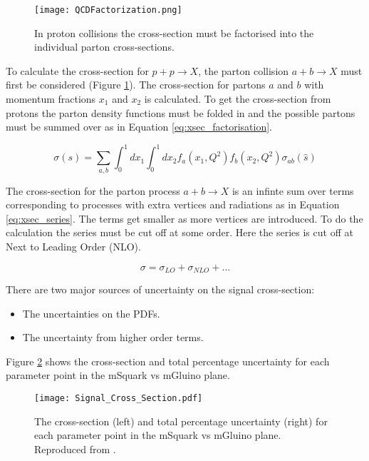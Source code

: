 \begin{figure}
\begin{center}
\texttt{[image: QCDFactorization.png]}
\end{center}
\caption{In proton collisions the cross-section must be factorised into the 
individual parton cross-sections.}
\label{fig:QCDFactorization}
\end{figure}

To calculate the cross-section for $p + p \rightarrow X$, the parton collision 
$a + b \rightarrow X$ must first be considered (Figure 
\ref{fig:QCDFactorization}). The cross-section for partons $a$ and $b$ with 
momentum fractions $x_{1}$ and $x_{2}$ is calculated. To get the cross-section 
from protons the parton density functions must be folded in and the possible 
partons must be summed over as in Equation \ref{eq:xsec_factorisation}.

\begin{equation}
\sigma(s) =
\displaystyle\sum\limits_{a,b}\int_{0}^{1}dx_{1}\int_{0}^{1}dx_{2}f_{a}(x_{1},Q^{2})f_{b}(x_{2},Q^{2})\sigma_{ab}(\hat{s})
\label{eq:xsec_factorisation}
\end{equation}

The cross-section for the parton process $a + b \rightarrow X$ is an infinte sum
over terms corresponding to processes with extra vertices and radiations as in
Equation \ref{eq:xsec_series}. The terms get smaller as more vertices are 
introduced. To do the calculation the series must be cut off at some order. Here
the series is cut off at Next to Leading Order (NLO).

\begin{equation}
\sigma = \sigma_{LO} + \sigma_{NLO} + ...
\label{eq:xsec_series}
\end{equation}

There are two major sources of uncertainty on the signal cross-section:

\begin{itemize} 
\item The uncertainties on the PDFs.
\item The uncertainty from higher order terms.
\end{itemize}

Figure \ref{fig:xsec_unc} shows the cross-section and total percentage 
uncertainty for each parameter point in the mSquark vs mGluino plane.

\begin{figure}
\begin{center}
\texttt{[image: Signal\_Cross\_Section.pdf]}
\end{center}
\caption{The cross-section (left) and total percentage uncertainty (right) for 
each parameter point in the mSquark vs mGluino plane. Reproduced from 
\cite{ra3}.}
\label{fig:xsec_unc}
\end{figure}

